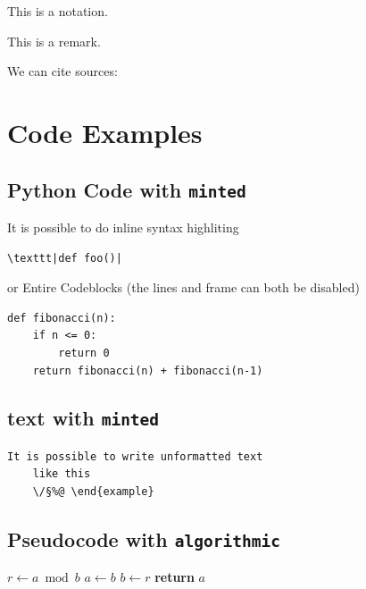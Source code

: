 \begin{notation}
    This is a notation.
\end{notation}

\begin{remark}
    This is a remark.
\end{remark}

We can cite sources: \cite[Additional info]{ftb}
\section{Code Examples}
\subsection{Python Code with \texttt{minted}}
It is possible to do inline syntax highliting 
\begin{verbatim}
\texttt|def foo()|
\end{verbatim}
or Entire Codeblocks (the lines and frame can both be disabled)
\begin{verbatim}
def fibonacci(n):
    if n <= 0:
        return 0
    return fibonacci(n) + fibonacci(n-1)
\end{verbatim}
\subsection{text with \texttt{minted}}
\begin{verbatim}
It is possible to write unformatted text
    like this
    \/§%@ \end{example}
\end{verbatim}

\subsection{Pseudocode with \texttt{algorithmic}}

\begin{algorithm}[H]
\caption{Euclid}
\begin{algorithmic}[1] %
            \State $r \gets a \bmod b$
            \State $a \gets b$
            \State $b \gets r$
        \EndWhile
        \State \textbf{return} $a$
    \EndProcedure
\end{algorithmic}
\end{algorithm}


